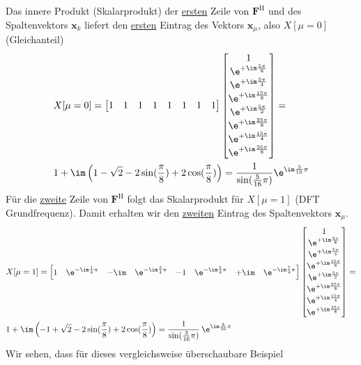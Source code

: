 \begin{ExCalc}
Das innere Produkt (Skalarprodukt) der \underline{ersten} Zeile von $\bm{F}^\mathrm{H}$ und des
Spaltenvektors $\bm{x}_k$ liefert den \underline{ersten} Eintrag des Vektors $\bm{x}_\mu$, also
$X[\mu=0]$ (Gleichanteil)
\begin{align}
&X[\mu=0] =
\begin{bmatrix}
1 & 1 & 1 & 1 & 1 & 1 & 1 & 1
\end{bmatrix}
\begin{bmatrix}
1\\
\e^{+\im \frac{5\pi}{8}}\\
\e^{+\im \frac{5\pi}{4}}\\
\e^{+\im \frac{15\pi}{8}}\\
\e^{+\im \frac{5\pi}{2}}\\
\e^{+\im \frac{25\pi}{8}}\\
\e^{+\im \frac{15\pi}{4}}\\
\e^{+\im \frac{35\pi}{8}}
\end{bmatrix}
=\\
&1 + \im \left(1 - \sqrt{2} - 2\sin(\frac{\pi}{8}) + 2\cos(\frac{\pi}{8})\right)
= \frac{1}{\sin(\frac{5}{16}\pi)} \e^{\im\frac{3}{16}\pi}
\end{align}
%
Für die \underline{zweite} Zeile von $\bm{F}^\mathrm{H}$ folgt das Skalarprodukt für
$X[\mu=1]$ (DFT Grundfrequenz). Damit erhalten wir den \underline{zweiten} Eintrag des
Spaltenvektors $\bm{x}_\mu$.
\begin{align}
&X[\mu=1] =
\begin{bmatrix}
1 & \e^{-\im\frac{1}{4}\pi} & -\im & \e^{-\im\frac{3}{4}\pi} & -1 & \e^{-\im\frac{5}{4}\pi} & +\im & \e^{-\im\frac{7}{4}\pi}
\end{bmatrix}
\begin{bmatrix}
1\\
\e^{+\im \frac{5\pi}{8}}\\
\e^{+\im \frac{5\pi}{4}}\\
\e^{+\im \frac{15\pi}{8}}\\
\e^{+\im \frac{5\pi}{2}}\\
\e^{+\im \frac{25\pi}{8}}\\
\e^{+\im \frac{15\pi}{4}}\\
\e^{+\im \frac{35\pi}{8}}
\end{bmatrix}
=\\
&1 + \im \left(-1 + \sqrt{2} - 2\sin(\frac{\pi}{8}) + 2\cos(\frac{\pi}{8})\right)=
\frac{1}{\sin(\frac{3}{16}\pi)}\,\e^{\im\frac{5}{16}\pi}
\end{align}
%
Wir sehen, dass für dieses vergleichsweise überschaubare Beispiel

\end{ExCalc}
